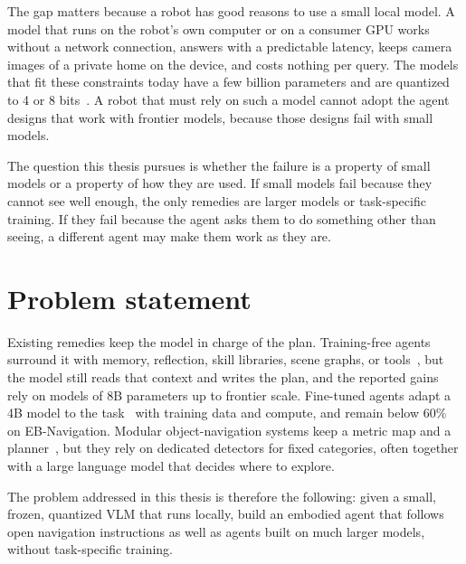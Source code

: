 The gap matters because a robot has good reasons to use a small local model. A model that runs on the robot's own
computer or on a consumer GPU works without a network connection, answers with a predictable latency, keeps camera
images of a private home on the device, and costs nothing per query. The models that fit these constraints today
have a few billion parameters and are quantized to 4 or 8 bits~\cite{lin2024awq}. A robot that must rely on such a
model cannot adopt the agent designs that work with frontier models, because those designs fail with small models.

The question this thesis pursues is whether the failure is a property of small models or a property of how they are
used. If small models fail because they cannot see well enough, the only remedies are larger models or task-specific
training. If they fail because the agent asks them to do something other than seeing, a different agent may make
them work as they are.

\section{Problem statement}
\label{sec:intro-problem}
Existing remedies keep the model in charge of the plan. Training-free agents surround it with memory, reflection,
skill libraries, scene graphs, or tools~\cite{lee2026emho,ma2026brainmem,zhou2026enabling,huang2025esca,ju2026embodiskill},
but the model still reads that context and writes the plan, and the reported gains rely on models of 8B parameters up
to frontier scale. Fine-tuned agents adapt a 4B model to the task~\cite{xie2026sva,jang2026musix} with training data
and compute, and remain below 60\% on EB-Navigation. Modular object-navigation systems keep a metric map and a
planner~\cite{gadre2022cows,yokoyama2023vlfm,yin2024online}, but they rely on dedicated detectors for fixed
categories, often together with a large language model that decides where to explore.

The problem addressed in this thesis is therefore the following: given a small, frozen, quantized VLM that runs
locally, build an embodied agent that follows open navigation instructions as well as agents built on much larger
models, without task-specific training.

